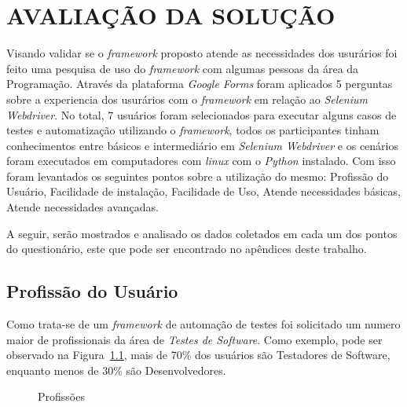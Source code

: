 
\chapter{AVALIAÇÃO DA SOLUÇÃO}\label{chap:result}

    Visando validar se o \textit{framework} proposto atende as necessidades dos usurários foi feito uma pesquisa de uso do \textit{framework} com algumas pessoas da área da Programação.
    Através da plataforma \textit{Google Forms} foram aplicados 5 perguntas sobre a experiencia dos usurários com o \textit{framework} em relação ao \textit{Selenium Webdriver}.
    No total, 7 usuários foram selecionados para executar alguns casos de testes e automatização utilizando o \textit{framework}, todos os participantes tinham conhecimentos entre
    básicos e intermediário em \textit{Selenium Webdriver} e os cenários foram executados em computadores com \textit{linux} com o \textit{Python} instalado.
    Com isso foram levantados os seguintes pontos sobre a utilização do mesmo:
    Profissão do Usuário,
    Facilidade de instalação,
    Facilidade de Uso,
    Atende necessidades básicas,
    Atende necessidades avançadas.

    A seguir, serão mostrados e analisado os dados coletados em cada um dos pontos do questionário, este que pode ser encontrado no apêndices deste trabalho.

    \section{Profissão do Usuário}
        Como trata-se de um \textit{framework} de automação de testes foi solicitado um numero maior de profissionais da área de \textit{Testes de Software}.
        Como exemplo, pode ser observado na Figura~\ref{fig:profissao}, mais de 70\% dos usuários são Testadores de Software, enquanto menos de 30\% são
        Desenvolvedores.

        \begin{figure}[H]
            \vspace*{0,2cm}
            \centering
            \caption{Profissões}
            \label{fig:profissao}
        \end{figure}

